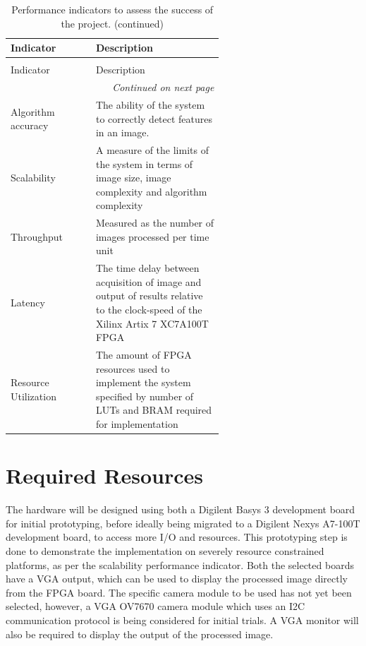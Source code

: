 \begin{center}
    \small
    \begin{longtable}{lp{0.6\linewidth}}
        \caption{Table of performance indicators.} \label{tab:performance}\\
        \toprule
        Indicator & Description \\
        \midrule
        \endfirsthead
        
        \caption{Performance indicators to assess the success of the project. (continued)} \\
        \toprule
        Indicator & Description \\
        \midrule
        \endhead
        
        \bottomrule
        \multicolumn{2}{r}{\textit{Continued on next page}} \\
        \endfoot
        
        \bottomrule
        \endlastfoot
        
        Algorithm accuracy      & The ability of the system to correctly detect features in an image. \\
        Scalability             & A measure of the limits of the system in terms of image size, image complexity and algorithm complexity \\
        Throughput              & Measured as the number of images processed per time unit \\
        Latency                 & The time delay between acquisition of image and output of results relative to the clock-speed of the Xilinx Artix 7 XC7A100T FPGA \\
        Resource Utilization    & The amount of FPGA resources used to implement the system specified by number of LUTs and BRAM required for implementation \\
    \end{longtable}
\end{center}

\section{Required Resources}
The hardware will be designed using both a Digilent Basys 3 development board for initial prototyping, before ideally being migrated to a Digilent Nexys A7-100T development board, to access more I/O and resources.
This prototyping step is done to demonstrate the implementation on severely resource constrained platforms, as per the scalability performance indicator. 
Both the selected boards have a VGA output, which can be used to display the processed image directly from the FPGA board. 
The specific camera module to be used has not yet been selected, however, a VGA OV7670 camera module which uses an I2C communication protocol is being considered for initial trials.
A VGA monitor will also be required to display the output of the processed image.


